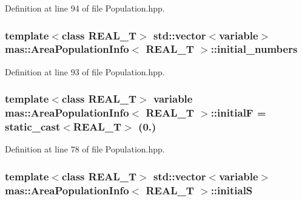 Definition at line 94 of file Population.\-hpp.

\hypertarget{structmas_1_1_area_population_info_a15a6fc016fc9c8ec98cf1eaf2e5bde17}{
\subsubsection[{initial\-\_\-numbers}]{\setlength{\rightskip}{0pt plus 5cm}template$<$class R\-E\-A\-L\-\_\-\-T$>$ std\-::vector$<${\bf variable}$>$ {\bf mas\-::\-Area\-Population\-Info}$<$ R\-E\-A\-L\-\_\-\-T $>$\-::initial\-\_\-numbers}}\label{structmas_1_1_area_population_info_a15a6fc016fc9c8ec98cf1eaf2e5bde17}


Definition at line 93 of file Population.\-hpp.

\hypertarget{structmas_1_1_area_population_info_acdfe3416f9a818b73fd894371b664c2a}{
\subsubsection[{initial\-F}]{\setlength{\rightskip}{0pt plus 5cm}template$<$class R\-E\-A\-L\-\_\-\-T$>$ {\bf variable} {\bf mas\-::\-Area\-Population\-Info}$<$ R\-E\-A\-L\-\_\-\-T $>$\-::initial\-F = static\-\_\-cast$<$R\-E\-A\-L\-\_\-\-T$>$ (0.)}}\label{structmas_1_1_area_population_info_acdfe3416f9a818b73fd894371b664c2a}


Definition at line 78 of file Population.\-hpp.

\hypertarget{structmas_1_1_area_population_info_aa6937a7e21cc365c77bea5298e745594}{
\subsubsection[{initial\-S}]{\setlength{\rightskip}{0pt plus 5cm}template$<$class R\-E\-A\-L\-\_\-\-T$>$ std\-::vector$<${\bf variable}$>$ {\bf mas\-::\-Area\-Population\-Info}$<$ R\-E\-A\-L\-\_\-\-T $>$\-::initial\-S}}\label{structmas_1_1_area_population_info_aa6937a7e21cc365c77bea5298e745594}


